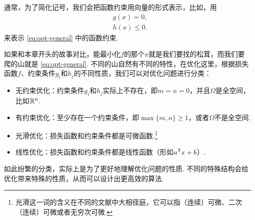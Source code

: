 通常，为了简化记号，我们会把函数约束用向量的形式表示，比如，用
\begin{align*}
    &g(x)=0,\\
    &h(x)\leq 0.
\end{align*}
来表示 \eqref{eq:opt-general} 中的函数约束. 

如果和本章开头的故事对比，能最小化$f$的那个$x$就是我们要找的松茸，而我们要爬的山就是 \eqref{eq:opt-general}. 不同的山自然有不同的特性，在优化这里，根据损失函数$f$、约束条件$g_i$和$h_j$的不同性质，我们可以对优化问题进行分类：
\begin{itemize}
\item 无约束优化：约束条件$g_i$和$h_j$实际上不存在，即$m=n=0$，并且$\Omega$是全空间，比如$\mathbb{R}^n$.
\item 有约束优化：至少存在一个约束条件，即$\max\{m,n\}\geq 1$，或者$\Omega$不是全空间. 
\item 光滑优化：损失函数和约束条件都是可微函数.\footnote{光滑这一词的含义在不同的文献中大相径庭，它可以指（连续）可微、二次（连续）可微或者无穷次可微. }
\item 线性优化：损失函数和约束条件都是线性函数（形如$a^{\mathsf{T}} x+b$）.
\end{itemize}

如此纷繁的分类，实际上是为了更好地理解优化问题的性质. 不同的特殊结构会给优化带来特殊的性质，从而可以设计出更高效的算法.

